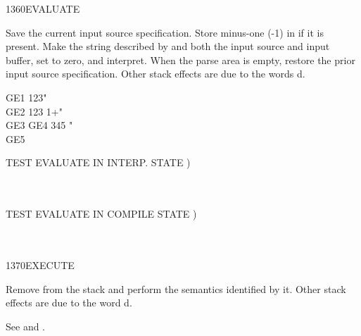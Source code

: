 \begin{worddef}{1360}{EVALUATE}
\item {}

	Save the current input source specification. Store minus-one
	(-1) in  if it is present. Make the string
	described by  and  both the input source
	and input buffer, set  to zero, and interpret. When
	the parse area is empty, restore the prior input source
	specification. Other stack effects are due to the words
	d.

	\begin{testing} %
		\ttfamily
		\word{:} GE1  123" \word{;}  \\
		\word{:} GE2  123 1+" \word{;}  \\
		\word{:} GE3  \word{:} GE4 345 \word{;}" \word{;} \\
		\word{:} GE5  \word{;} 

		  TEST EVALUATE IN INTERP. STATE ) \\
		 \\
		 \\

		  TEST EVALUATE IN COMPILE STATE ) \\
		 \\
		 \\

	\end{testing}
\end{worddef}


\begin{worddef}{1370}{EXECUTE}
\item {}

	Remove  from the stack and perform the semantics
	identified by it. Other stack effects are due to the word
	d.


	\begin{testing} %
		See  and .
	\end{testing}
\end{worddef}


